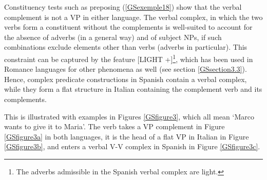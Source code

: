 \documentclass[output=paper]{langsci/langscibook}
\begin{document}
{\begin{exe}
	\ex \label{GSexemple23} 
	\begin{xlist}
        \label{GSexemple23a}

		\label{GSexemple23b}	
	\end{xlist}
\end{exe}

Constituency tests such as preposing (\ref{GSexemple18}) show that the verbal complement is not a VP in either language. The verbal complex, in which the two verbs form a constituent without the complements is well-suited to account for the absence of adverbs (in a general way) and of subject NPs, if such combinations exclude elements other than verbs (adverbs in particular). This constraint can be captured by the feature [LIGHT +]\footnote{The adverbs admissible in the Spanish verbal complex are light.}, which has been used in Romance languages for other phenomena as well \citep{abeille2000french} (see section \ref{GSsection3.3}). Hence, complex predicate constructions in Spanish contain a verbal complex, while they form a flat structure in Italian containing the complement verb and its complements. 

This is illustrated with examples in Figures \ref{GSfigure3}, which all mean `Marco wants to give it to Maria'. The verb takes a VP complement in Figure \ref{GSfigure3a} in both languages, it is the head of a flat VP in Italian in Figure \ref{GSfigure3b}, and enters a verbal V-V complex in Spanish in Figure \ref{GSfigure3c}.

}
\end{document}
